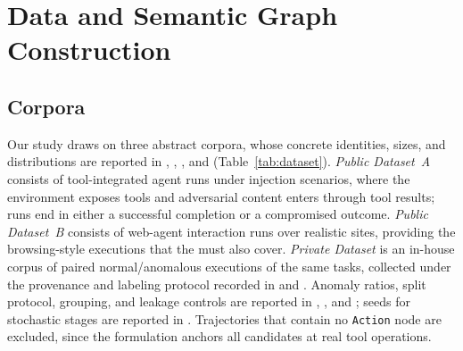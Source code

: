 \section{Data and Semantic Graph Construction}
\label{sec:data}

\subsection{Corpora}
Our study draws on three abstract corpora, whose concrete identities, sizes, and distributions are reported in , , , and  (Table~\ref{tab:dataset}). \emph{Public Dataset~A} consists of tool-integrated agent runs under injection scenarios, where the environment exposes tools and adversarial content enters through tool results; runs end in either a successful completion or a compromised outcome. \emph{Public Dataset~B} consists of web-agent interaction runs over realistic sites, providing the browsing-style executions that the \stg{} must also cover. \emph{Private Dataset} is an in-house corpus of paired normal/anomalous executions of the same tasks, collected under the provenance and labeling protocol recorded in  and . Anomaly ratios, split protocol, grouping, and leakage controls are reported in , , and ; seeds for stochastic stages are reported in . Trajectories that contain no \texttt{Action} node are excluded, since the formulation anchors all candidates at real tool operations.

\begin{table}[t]
\caption{Corpus overview. All fields are completed by the authors from the underlying corpora.}
\label{tab:dataset}
\end{table}

